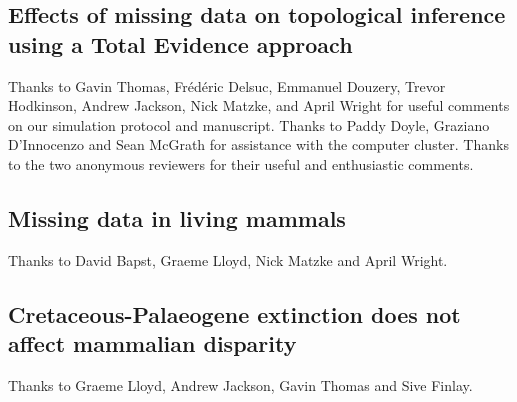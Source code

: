 \subsection*{Effects of missing data on topological inference using a Total Evidence approach}
Thanks to Gavin Thomas, Fr\'{e}d\'{e}ric Delsuc, Emmanuel Douzery, Trevor Hodkinson, Andrew Jackson, Nick Matzke, and April Wright for useful comments on our simulation protocol and manuscript. Thanks to Paddy Doyle, Graziano D'Innocenzo and Sean McGrath for assistance with the computer cluster. Thanks to the two anonymous reviewers for their useful and enthusiastic comments.

\subsection*{Missing data in living mammals}
Thanks to David Bapst, Graeme Lloyd, Nick Matzke and April Wright.

\subsection*{Cretaceous-Palaeogene extinction does not affect mammalian disparity}
Thanks to Graeme Lloyd, Andrew Jackson, Gavin Thomas and Sive Finlay.




